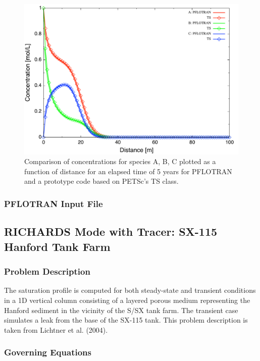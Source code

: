 \begin{figure}[h]\centering
\includegraphics[scale=0.5]{./figs/abc}
\caption{Comparison of concentrations for species A, B, C plotted as a function of distance for an elapsed time of 5 years for PFLOTRAN and a prototype code based on PETSc's TS class.}\label{fabc}
\end{figure}

\subsubsection{PFLOTRAN Input File}

\scriptsize
{}\label{tabc}
\normalsize

\newpage

\subsection{RICHARDS Mode with Tracer: SX-115 Hanford Tank Farm}

\subsubsection{Problem Description}

The saturation profile is computed for both steady-state and transient conditions in a 1D vertical column consisting of a layered porous medium representing the Hanford sediment in the vicinity of the S/SX tank farm. The transient case simulates a leak from the base of the SX-115 tank. This problem description is taken from Lichtner et al. (2004).

\subsubsection{Governing Equations}


